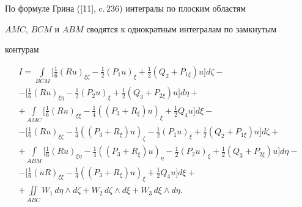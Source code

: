 По формуле Грина ([11], c.\,236) интегралы по плоским областям


$AMC$, $BCM$ и $ABM$ сводятся к однократным интегралам по замкнутым


контурам


\begin{gather*}


I=\int\limits_{BCM}


\bigg[ \frac{1}{6} (Ru)_{\xi\zeta}-\frac{1}{2} (P_1 u)_\xi


+\frac{1}{2} (Q_2+P_{1\xi})u \bigg] d\zeta - \\


%


-\bigg[ \frac{1}{6} (Ru)_{\xi\eta}-\frac{1}{2} (P_2 u)_\xi


+\frac{1}{2} (Q_3+P_{2\xi})u \bigg] d\eta + \\


%


+\int\limits_{AMC}


\bigg[ \frac{1}{6} (Ru)_{\xi\xi}-\frac{1}{4}


((P_3 +R_\xi)u)_\xi +\frac{1}{2} Q_4 u \bigg] d\xi - \\


%


-\bigg[ \frac{1}{6} (Ru)_{\xi\zeta}-\frac{1}{4}


((P_3 +R_\xi)u)_\zeta -\frac{1}{2}


(P_1 u)_\xi +\frac{1}{2} (Q_2+P_{1\xi})u \bigg] d\zeta + \\


%


+\int\limits_{ABM} \bigg[


\frac{1}{6} (Ru)_{\xi\eta}-\frac{1}{4}


((P_3 +R_\xi)u)_\eta -\frac{1}{2} (P_2 u)_\xi


+\frac{1}{2} (Q_3 +P_{2\xi})u \bigg] d\eta - \\


%


-\bigg[ \frac{1}{6} (uR)_{\xi\xi} -\frac{1}{4}


((P_3 +R_\xi)u)_\xi +\frac{1}{2} Q_4 u \bigg] d\xi + \\


%


+\iint\limits_{ABC} W_1\, d\eta\wedge d\zeta


+W_2\, d\zeta \wedge d\xi + W_3\, d\xi \wedge d\eta.


\end{gather*}


